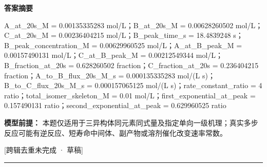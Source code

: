 \documentclass[UTF8,11pt,a4paper]{ctexart}
\begin{document}
\noindent\textbf{答案摘要}\par
A\_at\_20s\_M = 0.00135335283 mol/L；B\_at\_20s\_M = 0.00628260502 mol/L；C\_at\_20s\_M = 0.00236404215 mol/L；B\_peak\_time\_s = 18.4839248 s；B\_peak\_concentration\_M = 0.00629960525 mol/L；A\_at\_B\_peak\_M = 0.00157490131 mol/L；C\_at\_B\_peak\_M = 0.00212549344 mol/L；B\_fraction\_at\_20s = 0.628260502 fraction；C\_fraction\_at\_20s = 0.236404215 fraction；A\_to\_B\_flux\_20s\_M\_s = 0.000135335283 mol/(L s)；B\_to\_C\_flux\_20s\_M\_s = 0.000157065125 mol/(L s)；rate\_constant\_ratio = 4 ratio；total\_isomer\_skeleton\_M = 0.01 mol/L；first\_exponential\_at\_peak = 0.157490131 ratio；second\_exponential\_at\_peak = 0.629960525 ratio\par
\noindent\textbf{模型前提：}
本题仅适用于三异构体同元素同式量及指定单向一级机理；真实多步反应可能有逆反应、短寿命中间体、副产物或溶剂催化改变速率常数。\par
\noindent\textcolor{red!65!black}{[跨辑去重未完成 · 草稿]} \par
\medskip\hrule\medskip
{}
\end{document}
